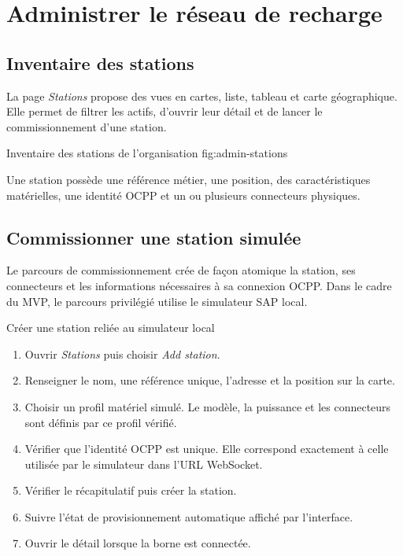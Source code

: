 \chapter{Administrer le réseau de recharge}

\section{Inventaire des stations}

La page \emph{Stations} propose des vues en cartes, liste, tableau et carte
géographique. Elle permet de filtrer les actifs, d'ouvrir leur détail et de
lancer le commissionnement d'une station.

  {Inventaire des stations de l'organisation}
  {fig:admin-stations}

Une station possède une référence métier, une position, des caractéristiques
matérielles, une identité OCPP et un ou plusieurs connecteurs physiques.

\section{Commissionner une station simulée}

Le parcours de commissionnement crée de façon atomique la station, ses
connecteurs et les informations nécessaires à sa connexion OCPP. Dans le cadre
du MVP, le parcours privilégié utilise le simulateur SAP local.

\begin{procedurebox}{Créer une station reliée au simulateur local}
  \begin{enumerate}[leftmargin=*]
    \item Ouvrir \emph{Stations} puis choisir \emph{Add station}.
    \item Renseigner le nom, une référence unique, l'adresse et la position sur
    la carte.
    \item Choisir un profil matériel simulé. Le modèle, la puissance et les
    connecteurs sont définis par ce profil vérifié.
    \item Vérifier que l'identité OCPP est unique. Elle correspond exactement à
    celle utilisée par le simulateur dans l'URL WebSocket.
    \item Vérifier le récapitulatif puis créer la station.
    \item Suivre l'état de provisionnement automatique affiché par l'interface.
    \item Ouvrir le détail lorsque la borne est connectée.
  \end{enumerate}
\end{procedurebox}

